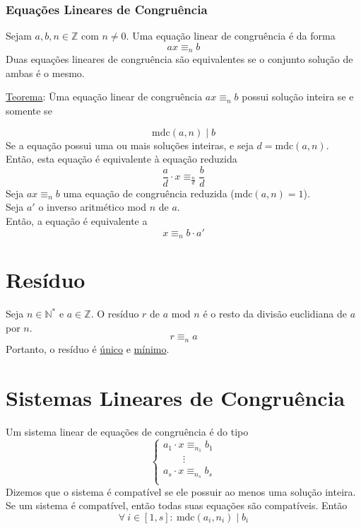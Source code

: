 \documentclass{article}
\begin{document}
\subsubsection{Equações Lineares de Congruência}
Sejam $a, b, n \in \mathbb{Z}$ com $n \neq 0$. Uma equação linear de congruência é da forma
\[ ax \equiv_n b \]
Duas equações lineares de congruência são equivalentes se o conjunto solução de ambas é o mesmo.\\
\begin{tabbing}
  \uline{Teorema}: \= Uma equação linear de congruência $ax \equiv_n b$ possui solução inteira se e somente se \\[5pt]
  \>\begin{minipage}{\textwidth}
    \[ \text{mdc}(a,n) \mid b \]
    Se a equação possui uma ou mais soluções inteiras, e seja $d = \text{mdc}(a,n)$. \\
    Então, esta equação é equivalente à equação reduzida
    \[ \frac{a}{d} \cdot x \equiv_{\frac{n}{d}} \frac{b}{d} \]
    Seja $ax \equiv_n b$ uma equação de congruência reduzida ($\text{mdc}(a, n) = 1$). \\
    Seja $a'$ o inverso aritmético mod $n$ de $a$. \\
    Então, a equação é equivalente a
    \[ x \equiv_n b \cdot a' \]
  \end{minipage}
\end{tabbing}



\section{Resíduo}
Seja $n \in \mathbb{N}^*$ e $a \in \mathbb{Z}$. O resíduo $r$ de $a$ mod $n$ é o resto da divisão euclidiana de $a$ por $n$.
\[ r \equiv_n a \]
Portanto, o resíduo é \uline{único} e \uline{mínimo}.




\section{Sistemas Lineares de Congruência}
Um sistema linear de equações de congruência é do tipo
\[
  \begin{cases}
    a_1 \cdot x \equiv_{n_1} b_1 \\
    \qquad \vdots \\
    a_s \cdot x \equiv_{n_s} b_s \\
  \end{cases}
\]
Dizemos que o sistema é compatível se ele possuir ao menos uma solução inteira. \\[5pt]
Se um sistema é compatível, então todas suas equações são compatíveis. Então
\[ \forall\: i \in [1, s]:\> \text{mdc}(a_i, n_i) \mid b_i \]
\end{document}
